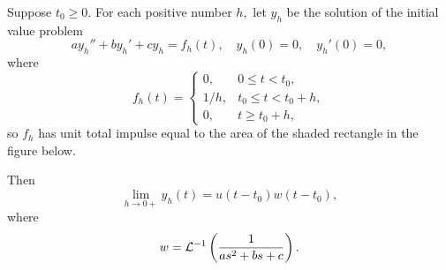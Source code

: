 \documentclass{ximera}
\begin{document}
\begin{theorem}\label{thmtype:8.7.1}
Suppose $t_0\geq 0.$ For each positive number $h,$ let $y_h$ be the
solution of the initial value problem
\begin{equation} \label{eq:8.7.1}
ay_h''+by_h'+cy_h=f_h(t), \quad  y_h(0)=0,\quad y_h'(0)=0,
\end{equation}
where
\begin{equation} \label{eq:8.7.2}
f_h(t)=\left\{\begin{array}{cl} 0,&0\leq t<t_0,\\
1/h,&t_0\leq t< t_0+h,\\
0,&t\geq t_0+h,\end{array}\right.
\end{equation}
 so  $f_h$ has unit total impulse
equal to the area of the shaded rectangle in the figure below. 

\begin{center}
\end{center}



Then
\begin{equation} \label{eq:8.7.3}
\lim_{h\rightarrow 0+}y_h(t)=u(t-t_0)w(t-t_0),
\end{equation}
where
$$
w={\cal L}^{-1}\left(\frac{1}{as^2+bs+c}\right).
$$
\end{theorem}
\end{document}
